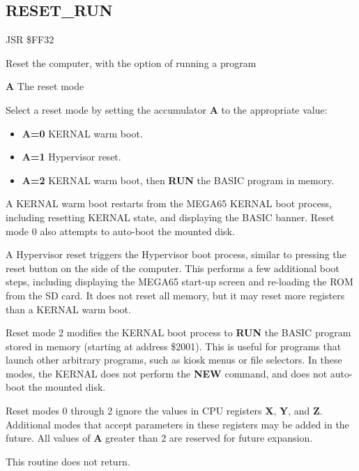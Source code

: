 
\newpage
\subsection{RESET{\_}RUN}
\label{KERNAL Jump Table!RESET_RUN}
\begin{description}[leftmargin=2cm,style=nextline]
    \item [Address:] JSR \$FF32
    \item [Description:] Reset the computer, with the option of running a program
    \item [Inputs:]
        \textbf{A} The reset mode

    \item [Remarks:]
        Select a reset mode by setting the accumulator {\bf A} to the appropriate value:
        \begin{itemize}
            \item {\bf A=0} KERNAL warm boot.
            \item {\bf A=1} Hypervisor reset.
            \item {\bf A=2} KERNAL warm boot, then {\bf RUN} the BASIC program in memory.
        \end{itemize}

        A KERNAL warm boot restarts from the MEGA65 KERNAL boot process, including resetting KERNAL state, and displaying the BASIC banner. Reset mode 0 also attempts to auto-boot the mounted disk.

        A Hypervisor reset triggers the Hypervisor boot process, similar to pressing the reset button on the side of the computer. This performs a few additional boot steps, including displaying the MEGA65 start-up screen and re-loading the ROM from the SD card. It does not reset all memory, but it may reset more registers than a KERNAL warm boot.

        Reset mode 2 modifies the KERNAL boot process to {\bf RUN} the BASIC program stored in memory (starting at address \$2001). This is useful for programs that launch other arbitrary programs, such as kiosk menus or file selectors. In these modes, the KERNAL does not perform the {\bf NEW} command, and does not auto-boot the mounted disk.

        Reset modes 0 through 2 ignore the values in CPU registers {\bf X}, {\bf Y}, and {\bf Z}. Additional modes that accept parameters in these registers may be added in the future. All values of {\bf A} greater than 2 are reserved for future expansion.

        This routine does not return.
    \item [Example:]
\end{description}


